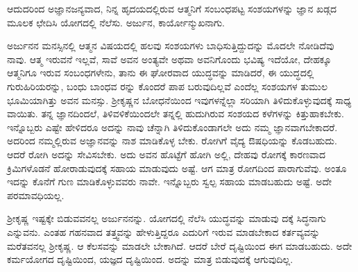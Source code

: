 {\small ಆದುದರಿಂದ ಅಜ್ಞಾನಜನ್ಯವಾದ, ನಿನ್ನ ಹೃದಯದಲ್ಲಿರುವ ಆತ್ಮನಿಗೆ ಸಂಬಂಧಪಟ್ಟ ಸಂಶಯಗಳನ್ನು ಜ್ಞಾನ ಖಡ್ಗದ ಮೂಲಕ ಛೇದಿಸಿ ಯೋಗದಲ್ಲಿ ನೆಲೆಸು. ಅರ್ಜುನ, ಕಾರ್ಯೋನ್ಮುಖನಾಗು.}

ಅರ್ಜುನನ ಮನಸ್ಸಿನಲ್ಲಿ ಆತ್ಮನ ವಿಷಯದಲ್ಲಿ ಹಲವು ಸಂಶಯಗಳು ಬಾಧಿಸುತ್ತಿದ್ದುದನ್ನು ಮೊದಲೇ ನೋಡಿದೆವು ನಾವು. ಆತ್ಮ ಇರುವನೆ ಇಲ್ಲವೆ, ಸಾವೆ ಅವನ ಅಂತ್ಯವೇ ಅಥವಾ ಅವನಿಗೊಂದು ಭವಿಷ್ಯ ಇದೆಯೋ, ದೇಹಕ್ಕೂ ಆತ್ಮನಿಗೂ ಇರುವ ಸಂಬಂಧಗಳೇನು, ತಾನು ಈ ಘೋರವಾದ ಯುದ್ಧವನ್ನು ಮಾಡಿದರೆ, ಈ ಯುದ್ಧದಲ್ಲಿ ಗುರುಹಿರಿಯರನ್ನು, ಬಂಧು ಬಾಂಧವ ರನ್ನು ಕೊಂದರೆ ಪಾಪ ಬರುವುದಿಲ್ಲವೆ ಎಂದೆಲ್ಲ ಸಂಶಯಗಳ ತುಮುಲ ಭೂಮಿಯಾಗಿತ್ತು ಅವನ ಮನಸ್ಸು. ಶ‍್ರೀಕೃಷ್ಣನ ಬೋಧನೆಯಿಂದ ಇವುಗಳನ್ನೆಲ್ಲಾ ಸರಿಯಾಗಿ ತಿಳಿದುಕೊಳ್ಳುವುದಕ್ಕೆ ಸಾಧ್ಯ ವಾಯಿತು. ತನ್ನ ಜ್ಞಾನದಿಂದಲೆ, ತಿಳಿವಳಿಕೆಯಿಂದಲೇ ತನ್ನಲ್ಲಿ ಹುದುಗಿರುವ ಸಂಶಯದ ಕಳೆಗಳನ್ನು ಕಿತ್ತುಹಾಕಬೇಕು. ಇನ್ನೊಬ್ಬರು ಎಷ್ಟೇ ಹೇಳಿದರೂ ಅದನ್ನು ನಾವು ಚೆನ್ನಾಗಿ ತಿಳಿದುಕೊಂಡಾಗಲೇ ಅದು ನಮ್ಮ ಜ್ಞಾನವಾಗಬೇಕಾದರೆ. ಅದರಿಂದ ನಮ್ಮಲ್ಲಿರುವ ಅಜ್ಞಾನವನ್ನು ನಾಶ ಮಾಡಿಕೊಳ್ಳ ಬೇಕು. ರೋಗಿಗೆ ವೈದ್ಯ ಔಷಧಿಯನ್ನು ಕೊಡಬಹುದು. ಆದರೆ ರೋಗಿ ಅದನ್ನು ಸೇವಿಸಬೇಕು. ಅದು ಅವನ ಹೊಟ್ಟೆಗೆ ಹೋಗಿ ಅಲ್ಲಿ, ದೇಹವು ರೋಗಕ್ಕೆ ಕಾರಣವಾದ ಕ್ರಿಮಿಗಳೊಡನೆ ಹೋರಾಡುವುದಕ್ಕೆ ಸಹಾಯ ಮಾಡುವುದು ಅಷ್ಟೆ. ಆಗ ಮಾತ್ರ ರೋಗದಿಂದ ಪಾರಾಗುವೆವು. ಅಂತೂ ಇದನ್ನು ಕೊನೆಗೆ ಗುಣ ಮಾಡಿಕೊಳ್ಳುವವರು ನಾವೇ. ಇನ್ನೊಬ್ಬರು ಸ್ವಲ್ಪ ಸಹಾಯ ಮಾಡಬಹುದು ಅಷ್ಟೆ. ಅದೇ ಪರಮಾವಧಿಯಲ್ಲ.

ಶ‍್ರೀಕೃಷ್ಣ ಇಷ್ಟಕ್ಕೇ ಬಿಡುವವನಲ್ಲ ಅರ್ಜುನನನ್ನು. ಯೋಗದಲ್ಲಿ ನೆಲೆಸಿ ಯುದ್ಧವನ್ನು ಮಾಡುವು ದಕ್ಕೆ ಸಿದ್ಧನಾಗು ಎನ್ನುವನು. ಎಂತಹ ಗಹನವಾದ ತತ್ತ್ವವನ್ನು ಹೇಳುತ್ತಿದ್ದರೂ ಎದುರಿಗೆ ಇರುವ ಮಾಡಬೇಕಾದ ಕರ್ತವ್ಯವನ್ನು ಮರೆತವನಲ್ಲ ಶ‍್ರೀಕೃಷ್ಣ. ಆ ಕೆಲಸವನ್ನು ಮಾಡಲೇ ಬೇಕಾಗಿದೆ. ಆದರೆ ಬೇರೆ ದೃಷ್ಟಿಯಿಂದ ಈಗ ಮಾಡಬಹುದು. ಅದೇ ಕರ್ಮಯೋಗದ ದೃಷ್ಟಿಯಿಂದ, ಯಜ್ಞದ ದೃಷ್ಟಿಯಿಂದ. ಅದನ್ನು ಮಾತ್ರ ಬಿಡುವುದಕ್ಕೆ ಆಗುವುದಿಲ್ಲ.

